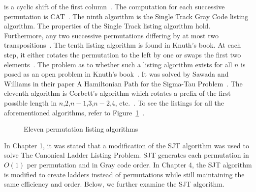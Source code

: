 is a cyclic shift of the first column~\cite{A36}. The computation for each successive permutation 
is CAT~\cite{A36}.
The ninth algorithm is the Single Track Gray Code listing algorithm. The properties of the Single Track 
listing algorithm hold. Furthermore, any two successive permutations differing by at most two transpositions~\cite{A36}.
The tenth listing algorithm is found in Knuth's book. At each step, it either rotates the permutation to the left by one 
or swaps the first two elements~\cite{A37}. The problem as to whether such a listing algorithm exists for all $n$ 
is posed as an open problem in Knuth's book~\cite{A37}. It was solved by Sawada and Williams in their paper 
A Hamiltonian Path for the Sigma-Tau Problem~\cite{A38}.
The eleventh algorithm is Corbett's algorithm which rotates a prefix of the first possible length in 
$n$,$2$,$n-1$,$3$,$n-2$,$4$, etc.~\cite{A34}. 
To see the listings for all the aforementioned algorithms, refer to Figure~\ref{Fig:11perms}~\cite{A42}.\par
\begin{figure} 
    \centering 
    \caption{Eleven permutation listing algorithms}
    \label{Fig:11perms}
\end{figure}

In Chapter 1, it was stated that a modification of the SJT algorithm was used to solve The Canonical Ladder Listing Problem. 
SJT generates each permutation in $O(1)$ per permutation and in Gray code order. In Chapter 4, the SJT 
algorithm is modified to create ladders instead of permutations while still maintaining the same efficiency and order. 
Below, we further examine the SJT algorithm.

